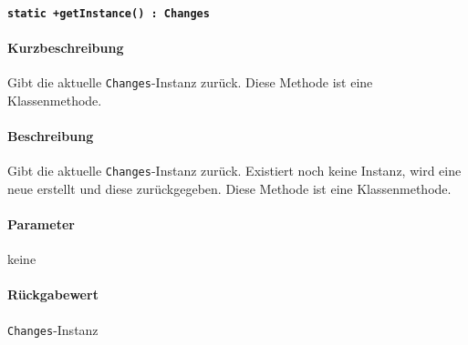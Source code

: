 \paragraph{\texttt{static +getInstance() : Changes}}%
\paragraph*{Kurzbeschreibung}
Gibt die aktuelle \verb#Changes#-Instanz zurück.
Diese Methode ist eine Klassenmethode.
\paragraph*{Beschreibung}
Gibt die aktuelle \verb#Changes#-Instanz zurück.
Existiert noch keine Instanz, wird eine neue erstellt und diese zurückgegeben.
Diese Methode ist eine Klassenmethode.
\paragraph*{Parameter}
keine
\paragraph*{Rückgabewert}
\verb#Changes#-Instanz